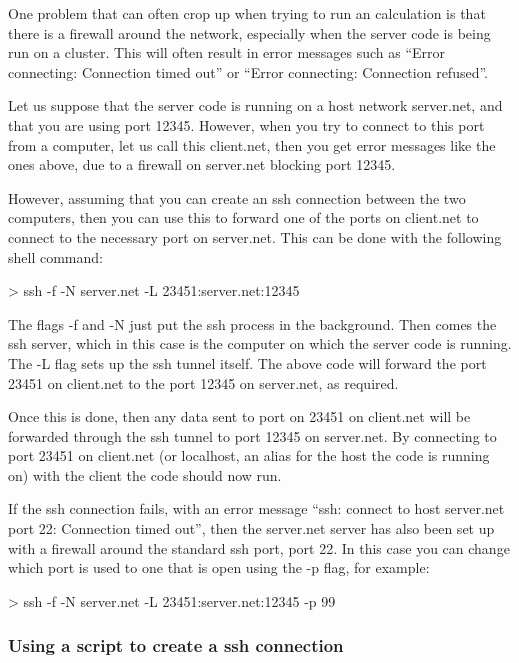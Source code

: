 \documentclass[11pt,english,fleqn]{report}
\newenvironment{code}{%
\footnotesize 
\verbatim
}{
\endverbatim
\normalsize
}
\begin{document}
\label{ssh_sockets}

One problem that can often crop up when trying to run an \ipi calculation
is that there is a firewall around the network, especially when the
server code is being run on a cluster. This will often result in error
messages such as {}``Error connecting: Connection timed out'' or
{}``Error connecting: Connection refused''.

Let us suppose that the server code is running on a host network server.net,
and that you are using port 12345. However, when you try to connect
to this port from a computer, let us call this client.net, then you
get error messages like the ones above, due to a firewall on server.net
blocking port 12345.

However, assuming that you can create an ssh connection between the
two computers, then you can use this to forward one of the ports on
client.net to connect to the necessary port on server.net. This can
be done with the following shell command:

\begin{code}
> ssh -f -N server.net -L 23451:server.net:12345
\end{code}

The flags -f and -N just put the ssh process in the background. Then
comes the ssh server, which in this case is the computer on which
the server code is running. The -L flag sets up the ssh tunnel itself.
The above code will forward the port 23451 on client.net to the port
12345 on server.net, as required.

Once this is done, then any data sent to port on 23451 on client.net
will be forwarded through the ssh tunnel to port 12345 on server.net.
By connecting to port 23451 on client.net (or localhost, an alias
for the host the code is running on) with the client the code should
now run.

If the ssh connection fails, with an error message {}``ssh: connect
to host server.net port 22: Connection timed out'', then the server.net
server has also been set up with a firewall around the standard ssh
port, port 22. In this case you can change which port is used to one
that is open using the -p flag, for example:

\begin{code}
> ssh -f -N server.net -L 23451:server.net:12345 -p 99
\end{code}


\subsubsection{Using a script to create a ssh connection}
\end{document}
